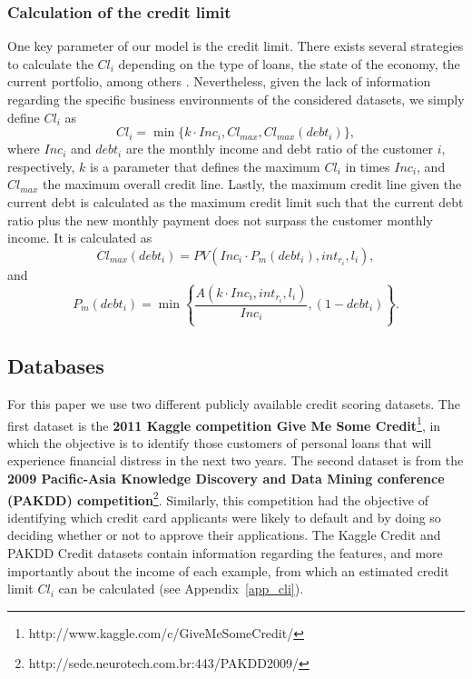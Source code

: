   \subsubsection{Calculation of the credit limit}
  
  One key parameter of our model is the credit limit. There exists several strategies to calculate 
  the $Cl_i$ depending on the type of loans, the state of the economy, the current portfolio, 
  among others \citep{Anderson2007,Lawrence2012}. Nevertheless, given the lack of information 
  regarding the specific business environments of the considered datasets, we simply define 
  $Cl_i$ as
  \begin{equation}\label{eq:cli}
      Cl_i = \min \bigg\{ k \cdot Inc_i, Cl_{max}, Cl_{max}(debt_i) \bigg\},
  \end{equation}
  where $Inc_i$ and $debt_i$ are the monthly income and debt ratio of the customer $i$, 
  respectively, $k$ is a parameter that defines the maximum $Cl_i$ in times $Inc_i$, and 
  $Cl_{max}$ the maximum overall credit line. Lastly, the maximum credit line given the current 
  debt is calculated as the maximum credit limit such that the current debt ratio plus the new 
  monthly payment does not surpass the customer monthly income. It is calculated as
  \begin{equation}
    Cl_{max}(debt_i)=PV\left(Inc_i \cdot P_{m}(debt_i),int_{r_i},l_i\right),
  \end{equation}
  and
  \begin{equation}
    P_{m}(debt_i)=\min \left\{ \frac{A(k \cdot Inc_i,int_{r_i},l_i)}{Inc_i},\left(1-debt_i 
    \right) \right\}.
  \end{equation}
  
  
  \subsection{Databases}

    For this paper we use two different publicly available credit scoring datasets. The first 
    dataset is the \textbf{2011 Kaggle competition Give Me Some Credit}\footnote{ 
    http://www.kaggle.com/c/GiveMeSomeCredit/}, in which the objective is to identify those 
    customers of personal loans that will experience financial distress in the next two years.
    The second dataset is from the \textbf{2009 Pacific-Asia Knowledge Discovery and Data Mining 
    conference (PAKDD) competition}\footnote{http://sede.neurotech.com.br:443/PAKDD2009/}.
    Similarly, this competition had the objective of identifying which credit card applicants
    were likely to default and by doing so deciding whether or not to approve their applications.
    The Kaggle Credit and PAKDD Credit datasets contain information regarding the features, and 
    more importantly about the income of each example, from which an estimated credit limit 
    $Cl_i$ can be calculated (see Appendix~\ref{app_cli}).
    
